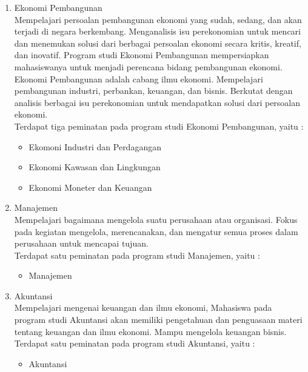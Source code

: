 	\begin{enumerate}
		\item Ekonomi Pembangunan\\
			 Mempelajari persoalan pembangunan ekonomi yang sudah, sedang, dan akan
terjadi di negara berkembang. Menganalisis isu perekonomian untuk mencari dan menemukan solusi dari berbagai persoalan ekonomi secara kritis, kreatif, dan inovatif. Program studi Ekonomi Pembangunan mempersiapkan mahasiswanya untuk menjadi perencana bidang pembangunan ekonomi. Ekonomi Pembangunan adalah cabang ilmu ekonomi. Mempelajari pembangunan industri, perbankan, keuangan, dan bisnis. Berkutat dengan analisis berbagai isu perekonomian untuk mendapatkan solusi dari persoalan ekonomi.\\

			Terdapat tiga peminatan pada program studi Ekonomi Pembangunan, yaitu :
			\begin{itemize}
				\item Ekomoni Industri dan Perdagangan
				\item Ekonomi Kawasan dan Lingkungan
				\item Ekonomi Moneter dan Keuangan
			\end{itemize}\leavevmode

		\item Manajemen\\
			Mempelajari bagaimana mengelola suatu perusahaan atau organisasi. Fokus pada kegiatan mengelola, merencanakan, dan mengatur semua proses dalam perusahaan untuk mencapai tujuan.\\
			
			Terdapat satu peminatan pada program studi Manajemen, yaitu :
			\begin{itemize}
				\item Manajemen
			\end{itemize}\leavevmode

		\item Akuntansi\\
			Mempelajari mengenai keuangan dan ilmu ekonomi, Mahasiswa pada program studi Akuntansi akan memiliki pengetahuan dan penguasaan materi tentang keuangan dan ilmu ekonomi. Mampu mengelola keuangan bisnis.\\
			
			Terdapat satu peminatan pada program studi Akuntansi, yaitu :
			\begin{itemize}
				\item Akuntansi
			\end{itemize}\leavevmode
		
			
	\end{enumerate}\leavevmode

